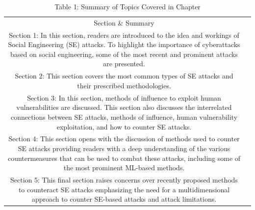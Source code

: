 \begin{table}
    \justifying
\caption{Table 1: Summary of Topics Covered in Chapter}
\label{tab:placeholder}
    \begin{tabular}{cc}
         Section \& Summary\\
         Section 1: In this section, readers are introduced to the idea and workings of Social Engineering (SE) attacks. To highlight the importance of cyberattacks based on social engineering, some of the most recent and prominent attacks are presented.\\
         Section 2: This section covers the most common types of SE attacks and their prescribed methodologies.\\
         Section 3: In this section, methods of influence to exploit human vulnerabilities are discussed. This section also discusses the interrelated connections between SE attacks, methods of influence, human vulnerability exploitation, and how to counter SE attacks.\\
         Section 4: This section opens with the discussion of methods used to counter SE attacks providing readers with a deep understanding of the various countermeasures that can be used to combat these attacks, including some of the most prominent ML-based methods.\\
         Section 5: This final section raises concerns over recently proposed methods to counteract SE attacks emphasizing the need for a multidimensional approach to counter SE-based attacks and attack limitations.\\
    \end{tabular}
    
    
\end{table}



